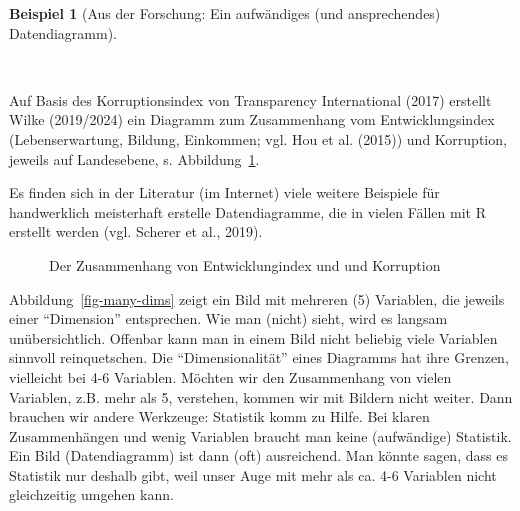 \documentclass[
  letterpaper,
  oneside,
  open=any]{scrbook}
\theoremstyle{definition}
\theoremstyle{definition}
\newtheorem{example}{Beispiel}[chapter]
\theoremstyle{definition}
\theoremstyle{remark}
\begin{document}
\begin{example}[Aus der Forschung: Ein aufwändiges (und ansprechendes)
Datendiagramm]\protect\hypertarget{exm-datendiagramm}{}\label{exm-datendiagramm}

~

Auf Basis des Korruptionsindex von Transparency International (2017)
erstellt Wilke (2019/2024) ein Diagramm zum Zusammenhang vom
Entwicklungsindex (Lebenserwartung, Bildung, Einkommen; vgl. Hou et al.
(2015)) und Korruption, jeweils auf Landesebene, s.
Abbildung~\ref{fig-develop-corrupt}.

Es finden sich in der Literatur (im Internet) viele weitere Beispiele
für handwerklich meisterhaft erstelle Datendiagramme, die in vielen
Fällen mit R erstellt werden (vgl. Scherer et al., 2019).

\begin{figure}


\caption{\label{fig-develop-corrupt}Der Zusammenhang von
Entwicklungindex und und Korruption}

\end{figure}%

\end{example}

Abbildung~\ref{fig-many-dims} zeigt ein Bild mit mehreren (5) Variablen,
die jeweils einer \enquote{Dimension} entsprechen. Wie man (nicht)
sieht, wird es langsam unübersichtlich. Offenbar kann man in einem Bild
nicht beliebig viele Variablen sinnvoll reinquetschen. Die
\enquote{Dimensionalität} eines Diagramms hat ihre Grenzen, vielleicht
bei 4-6 Variablen. Möchten wir den Zusammenhang von vielen Variablen,
z.B. mehr als 5, verstehen, kommen wir mit Bildern nicht weiter. Dann
brauchen wir andere Werkzeuge: Statistik komm zu Hilfe. Bei klaren
Zusammenhängen und wenig Variablen braucht man keine (aufwändige)
Statistik. Ein Bild (Datendiagramm) ist dann (oft) ausreichend. Man
könnte sagen, dass es Statistik nur deshalb gibt, weil unser Auge mit
mehr als ca. 4-6 Variablen nicht gleichzeitig umgehen kann.
\end{document}
